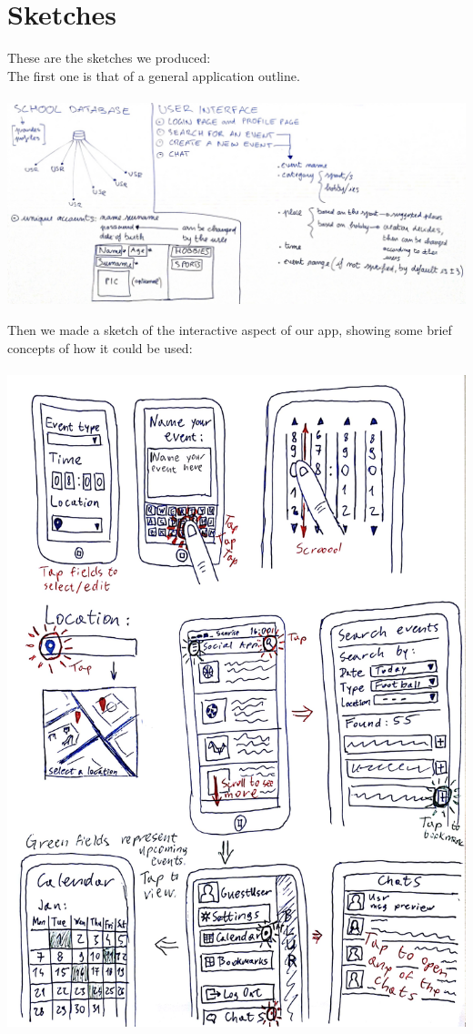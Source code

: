\documentclass[12pt]{report}
\begin{document}
	\section*{\huge Sketches}
	These are the sketches we produced:\\
	The first one is that of a general application outline.\\\\
	\includegraphics[width=\linewidth]{FirstDesign.jpg}\break
	\newpage

	Then we made a sketch of the interactive aspect of our app, showing some brief concepts of how it could be used:\\\\
	\includegraphics[scale=0.15]{Interaction.jpg}\break
	\newpage
\end{document}
